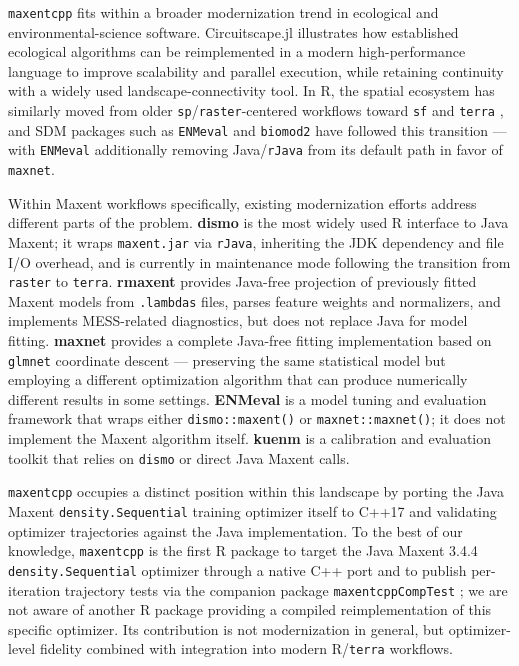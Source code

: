 \documentclass[10pt,letterpaper]{article}
\begin{document}
\texttt{maxentcpp} fits within a broader modernization trend in
ecological and environmental-science software. Circuitscape.jl
\cite{Hall2021} illustrates how established ecological algorithms can
be reimplemented in a modern high-performance language to improve
scalability and parallel execution, while retaining continuity with a
widely used landscape-connectivity tool. In R, the spatial ecosystem has
similarly moved from older \texttt{sp}/\texttt{raster}-centered
workflows toward \texttt{sf} \cite{Pebesma2018} and \texttt{terra}
\cite{Hijmans2024}, and SDM packages such as \texttt{ENMeval}
\cite{Kass2021} and \texttt{biomod2} \cite{Thuiller2009} have followed
this transition --- with \texttt{ENMeval} additionally removing
Java/\texttt{rJava} from its default path in favor of \texttt{maxnet}.

Within Maxent workflows specifically, existing modernization efforts
address different parts of the problem. \textbf{dismo}
\cite{Hijmans2023} is the most widely used R interface to Java Maxent;
it wraps \texttt{maxent.jar} via \texttt{rJava}, inheriting the JDK
dependency and file I/O overhead, and is currently in maintenance mode
following the transition from \texttt{raster} to \texttt{terra}.
\textbf{rmaxent} \cite{Baumgartner2017} provides Java-free projection
of previously fitted Maxent models from \texttt{.lambdas} files, parses
feature weights and normalizers, and implements MESS-related
diagnostics, but does not replace Java for model fitting.
\textbf{maxnet} \cite{Phillips2024maxnet,Friedman2010} provides a
complete Java-free fitting implementation based on \texttt{glmnet}
coordinate descent --- preserving the same statistical model but
employing a different optimization algorithm that can produce
numerically different results in some settings. \textbf{ENMeval}
\cite{Kass2021} is a model tuning and evaluation framework that wraps
either \texttt{dismo::maxent()} or \texttt{maxnet::maxnet()}; it does
not implement the Maxent algorithm itself. \textbf{kuenm}
\cite{Cobos2019} is a calibration and evaluation toolkit that relies on
\texttt{dismo} or direct Java Maxent calls.

\texttt{maxentcpp} occupies a distinct position within this landscape by
porting the Java Maxent \texttt{density.Sequential} training optimizer
itself to C++17 and validating optimizer trajectories against the Java
implementation. To the best of our knowledge, \texttt{maxentcpp} is the
first R package to target the Java Maxent 3.4.4
\texttt{density.Sequential} optimizer through a native C++ port and to
publish per-iteration trajectory tests via the companion package
\texttt{maxentcppCompTest} \cite{maxentcppCompTest2025}; we are not
aware of another R package providing a compiled reimplementation of this
specific optimizer. Its contribution is not modernization in general,
but optimizer-level fidelity combined with integration into modern
R/\texttt{terra} workflows.
\end{document}
